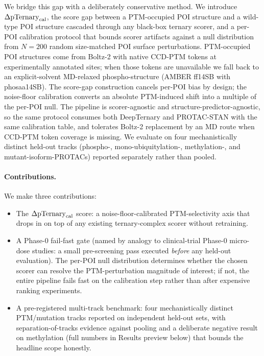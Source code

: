 We bridge this gap with a deliberately conservative method. We introduce $\Delta\mathrm{pTernary}_{\mathrm{cal}}$, the score gap between a PTM-occupied POI structure and a wild-type POI structure cascaded through any black-box ternary scorer, and a per-POI calibration protocol that bounds scorer artifacts against a null distribution from $N{=}200$ random size-matched POI surface perturbations. PTM-occupied POI structures come from Boltz-2 with native CCD-PTM tokens at experimentally annotated sites; when those tokens are unavailable we fall back to an explicit-solvent MD-relaxed phospho-structure (AMBER ff14SB with phosaa14SB). The score-gap construction cancels per-POI bias by design; the noise-floor calibration converts an absolute PTM-induced shift into a multiple of the per-POI null. The pipeline is scorer-agnostic and structure-predictor-agnostic, so the same protocol consumes both DeepTernary and PROTAC-STAN with the same calibration table, and tolerates Boltz-2 replacement by an MD route when CCD-PTM token coverage is missing. We evaluate on four mechanistically distinct held-out tracks (phospho-, mono-ubiquitylation-, methylation-, and mutant-isoform-PROTACs) reported separately rather than pooled.

\paragraph{Contributions.} We make three contributions:
\begin{itemize}[leftmargin=*,itemsep=2pt,topsep=2pt]
\item The $\Delta\mathrm{pTernary}_{\mathrm{cal}}$ score: a noise-floor-calibrated PTM-selectivity axis that drops in on top of any existing ternary-complex scorer without retraining.
\item A Phase-0 fail-fast gate (named by analogy to clinical-trial Phase-0 micro-dose studies: a small pre-screening pass executed \emph{before} any held-out evaluation). The per-POI null distribution determines whether the chosen scorer can resolve the PTM-perturbation magnitude of interest; if not, the entire pipeline fails fast on the calibration step rather than after expensive ranking experiments.
\item A pre-registered multi-track benchmark: four mechanistically distinct PTM/mutation tracks reported on independent held-out sets, with separation-of-tracks evidence against pooling and a deliberate negative result on methylation (full numbers in Results preview below) that bounds the headline scope honestly.
\end{itemize}

